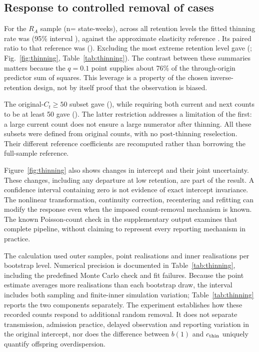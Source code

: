 \subsection{Response to controlled removal of cases}
\label{sec:res-thinning}

For the $R_A$ sample (n=\Nra{} state-weeks), across all retention levels the fitted thinning rate was \ThinAllPoint{} (95\% interval \ThinAllInterval{}), against the approximate elasticity reference \ThinBPPoint{}. Its paired ratio to that reference was \ThinRatioPoint{} (\ThinRatioInterval{}). Excluding the most extreme retention level gave \ThinNoqPoint{} (\ThinNoqInterval{}; Fig.~\ref{fig:thinning}, Table~\ref{tab:thinning}). The contrast between these summaries matters because the $q=0.1$ point supplies about 76\% of the through-origin predictor sum of squares. This leverage is a property of the chosen inverse-retention design, not by itself proof that the observation is biased.

The original-$C_t\ge50$ subset gave \ThinHighPoint{} (\ThinHighInterval{}), while requiring both current and next counts to be at least 50 gave \ThinBothPoint{} (\ThinBothInterval{}). The latter restriction addresses a limitation of the first: a large current count does not ensure a large numerator after thinning. All these subsets were defined from original counts, with no post-thinning reselection. Their different reference coefficients are recomputed rather than borrowing the full-sample reference.

Figure~\ref{fig:thinning} also shows changes in intercept and their joint uncertainty. These changes, including any departure at low retention, are part of the result. A confidence interval containing zero is not evidence of exact intercept invariance. The nonlinear transformation, continuity correction, recentering and refitting can modify the response even when the imposed count-removal mechanism is known. The known Poisson-count check in the supplementary output examines that complete pipeline, without claiming to represent every reporting mechanism in practice.

The calculation used \ThinBootstrap{} outer samples, \ThinPointReps{} point realisations and \ThinInnerReps{} inner realisations per bootstrap level. Numerical precision is documented in Table~\ref{tab:thinning}, including the predefined Monte Carlo check and fit failures. Because the point estimate averages more realisations than each bootstrap draw, the interval includes both sampling and finite-inner simulation variation; Table~\ref{tab:thinning} reports the two components separately. The experiment establishes how these recorded counts respond to additional random removal. It does not separate transmission, admission practice, delayed observation and reporting variation in the original intercept, nor does the difference between $b(1)$ and $c_{\rm thin}$ uniquely quantify offspring overdispersion.

